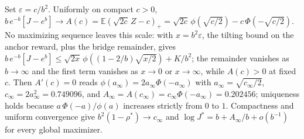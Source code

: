\documentclass[11pt]{article}
\theoremstyle{itheads}
\newcommand{\E}{\mathbb{E}}
\begin{document}
Set $\varepsilon=c/b^{2}$. Uniformly on compact $c>0$,
$b\,e^{-b}[J-e^{b}]\to A(c)=\E(\sqrt{2c}\,Z-c)_+
=\sqrt{2c}\,\phi(\sqrt{c/2})-c\,\Phi(-\sqrt{c/2})$. No maximizing
sequence leaves this scale: with $x=b^{2}\varepsilon$, the tilting bound
on the anchor reward, plus the bridge remainder, gives
$b\,e^{-b}[J-e^{b}]\le\sqrt{2x}\,\phi((1-2/b)\sqrt{x/2})+K/b^{2}$; the
remainder vanishes as $b\to\infty$ and the first term vanishes as
$x\to0$ or $x\to\infty$, while $A(c)>0$ at fixed $c$. Then
$A'(c)=0$ reads $\phi(a_\infty)=2a_\infty\Phi(-a_\infty)$ with
$a_\infty=\sqrt{c_\infty/2}$, $c_\infty=2a_\infty^{2}=0.749096$, and
$A_\infty=A(c_\infty)=c_\infty\Phi(-a_\infty)=0.202456$; uniqueness
holds because $a\,\Phi(-a)/\phi(a)$ increases strictly from $0$ to $1$.
Compactness and uniform convergence give $b^{2}(1-\rho^{*})\to c_\infty$
and $\log J^{*}=b+A_\infty/b+o(b^{-1})$ for every global maximizer.
\end{document}
